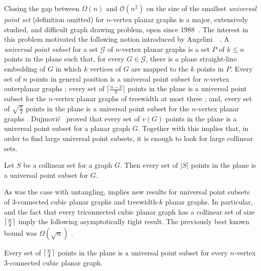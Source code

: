 Closing the gap between $\Omega(n)$ and $\mathcal{O}(n^2)$ on the size of the
smallest \emph{universal point set} (definition omitted) for $n$-vertex planar graphs is a major, extensively studied, and difficult graph
drawing problem, open since $1988$~\cite{deFraysseix:1988:SSS:62212.62254, dFPP90, DBLP:journals/ipl/Kurowski04, DBLP:journals/jgaa/BannisterCDE14}. The interest in this problem motivated the following notion introduced by Angelini~\etal~\cite{abehlmmo-ups-12}. 
A \emph{universal point subset} for  a set $\mathcal{G}$ of $n$-vertex planar graphs is a
set $P$ of $k\leq n$ points in the plane such that, for every
$G\in\mathcal{G}$, there is a plane straight-line
embedding of $G$ in which $k$ vertices of $G$ are mapped to the $k$
points in $P$. Every set of $n$ points in general position is a
universal point subset for $n$-vertex outerplanar graphs
\cite{GMPP,DBLP:journals/comgeo/Bose02,DBLP:conf/cccg/CastanedaU96};  every
set of $\lceil \frac{n-3}{8}\rceil$ points in the plane is a universal
point subset for the $n$-vertex planar graphs of treewidth at most
three \cite{dalozzo.dujmovic.ea:drawing}; and, every set of $\sqrt{\frac{n}{2}}$ points in the plane is a universal point
subset for the $n$-vertex planar graphs \cite{dujmovic:utility}. Dujmovi\'c~\cite{dujmovic:utility}
  proved that every set of $v(G)$ points in the plane is a universal point subset
  for a planar graph $G$. Together with  this implies
  that, in order to find large universal point subsets, it is enough to look for large collinear sets.

\begin{thm}
Let $S$ be a collinear set for a graph $G$. Then every set of $|S|$ points in the
plane is a universal point subset for $G$.
\end{thm}

As was the case with untangling,  implies new results
for universal point subsets of 3-connected cubic planar graphs and
treewidth-$k$ planar graphs. In particular,  and the
fact that every triconnected cubic planar graph has a collinear set of
size ${\lceil \frac{n}{4} \rceil}$ \cite{dalozzo.dujmovic.ea:drawing} imply the
following asymptotically tight result. The previously best known bound
was $\Omega(\sqrt{n})$ \cite{dujmovic:utility}.

\begin{cor}
Every set of ${\lceil \frac{n}{4} \rceil}$ points in the plane  is a universal
point subset for  every $n$-vertex 3-connected cubic
planar graph.
\end{cor}

